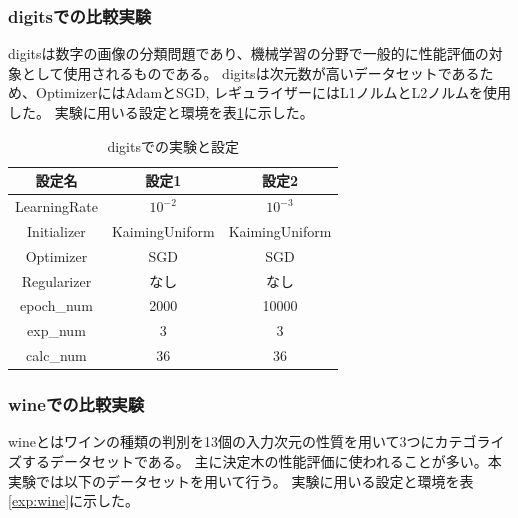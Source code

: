 \subsubsection{digitsでの比較実験}
\label{impl:digits}

digitsは数字の画像の分類問題であり、機械学習の分野で一般的に性能評価の対象として使用されるものである。
digitsは次元数が高いデータセットであるため、OptimizerにはAdamとSGD, レギュライザーにはL1ノルムとL2ノルムを使用した。
実験に用いる設定と環境を表\ref{exp:digits}に示した。

\begin{table}[htbp]
    \begin{center}
        \caption{digitsでの実験と設定}
        \label{exp:digits}
        \vspace{2mm} 
        \begin{tabular}{ |c|c|c| }
        \hline
        設定名 & 設定1 & 設定2 \\
        \hline
        LearningRate         & $ 10^{-2} $ & $ 10^{-3} $ \\
        \hline
        Initializer       & KaimingUniform &  KaimingUniform \\
        \hline
        Optimizer           & SGD & SGD \\
        \hline
        Regularizer     & なし & なし \\
        \hline
        epoch\_num       & 2000 &  10000 \\
        \hline
        exp\_num         & 3 & 3 \\
        \hline
        calc\_num        & 36 & 36 \\
        \hline
        \end{tabular}
    \end{center}
\end{table}



\subsubsection{wineでの比較実験}
\label{impl:wine}

wineとはワインの種類の判別を13個の入力次元の性質を用いて3つにカテゴライズするデータセットである。
主に決定木の性能評価に使われることが多い。本実験では以下のデータセットを用いて行う。
実験に用いる設定と環境を表\ref{exp:wine}に示した。


